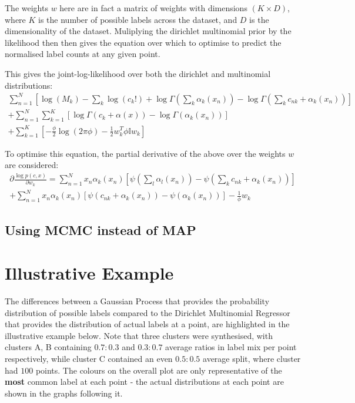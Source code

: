 The weights $w$ here are in fact a matrix of weights with dimensions $(K \times D)$, where $K$ is the number of possible labels across the dataset, and $D$ is the dimensionality of the dataset. Muliplying the dirichlet multinomial prior by the likelihood then then gives the equation over which to optimise to predict the normalised label counts at any given point.

This gives the joint-log-likelihood over both the dirichlet and multinomial distributions:
\begin{multline}
    \sum^N_{n=1} [\log(M_k) - \sum_k \log(c_k!) + \log \Gamma(\sum_k \alpha_k(x_n)) - \log \Gamma(\sum_k c_{nk} + \alpha_k(x_n))] \\
    + \sum^N_{n=1} \sum^K_{k=1} [\log \Gamma(c_k + \alpha(x)) - \log \Gamma(\alpha_k(x_n))] \\
    + \sum^K_{k=1} [-\frac{\phi}{2} \log(2\pi \phi) - \frac{1}{2}w_k^T \phi \mathbb{I} w_k]
\end{multline}

To optimise this equation, the partial derivative of the above over the weights $w$ are considered:
\begin{multline}
    \partial \frac{\log p(c, x)}{\partial w_k} = \sum_{n=1}^N x_n \alpha_k (x_n) [\psi(\sum_l \alpha_l(x_n)) - \psi(\sum_k c_{nk} + \alpha_k(x_n))] \\
    + \sum^N_{n=1} x_n \alpha_k (x_n) [\psi (c_{nk} + \alpha_k(x_n)) - \psi(\alpha_k(x_n))] - \frac{1}{\phi} w_k
\end{multline}


\subsection{Using MCMC instead of MAP}
\section{Illustrative Example}

The differences between a Gaussian Process that provides the probability distribution of possible labels compared to the Dirichlet Multinomial Regressor that provides the distribution of actual labels at a point, are highlighted in the illustrative example below. Note that three clusters were synthesised, with clusters A, B containing $0.7:0.3$ and $0.3:0.7$ average ratios in label mix per point respectively, while cluster C contained an even $0.5:0.5$ average split, where cluster had $100$ points. The colours on the overall plot are only representative of the \textbf{most} common label at each point - the actual distributions at each point are shown in the graphs following it.

